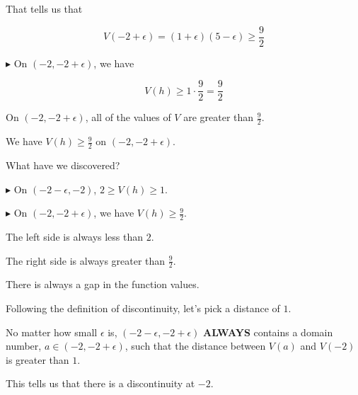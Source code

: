 \documentclass{ximera}
\begin{document}
\begin{explanation}
\begin{itemize}
That tells us that

\[ V(-2 + \epsilon) =  (1 + \epsilon) (5 - \epsilon) \geq \frac{9}{2} \]


\textbf{\textcolor{blue!55!black}{$\blacktriangleright$}} On $(-2, -2 + \epsilon)$, we have


\[
V(h) \geq 1 \cdot \frac{9}{2} = \frac{9}{2}
\]



On $(-2, -2 + \epsilon)$, all of the values of $V$ are greater than $\frac{9}{2}$.


We have $V(h) \geq  \frac{9}{2}$ on $(-2, -2 + \epsilon)$.




\end{itemize}


What have we discovered?


\textbf{\textcolor{red!70!darkgray}{$\blacktriangleright$}} On $(-2 - \epsilon, -2)$, $2 \geq V(h) \geq 1$. 

\textbf{\textcolor{red!70!darkgray}{$\blacktriangleright$}} On $(-2, -2 + \epsilon)$, we have $V(h) \geq  \frac{9}{2}$. 

The left side is always less than $2$.

The right side is always greater than $\frac{9}{2}$.


There is always a gap in the function values.


Following the definition of discontinuity, let's pick a distance of $1$.


No matter how small $\epsilon$ is, $(-2 - \epsilon, -2 + \epsilon)$ \textbf{\textcolor{red!70!darkgray}{ALWAYS}} contains a domain number, $a \in (-2, -2 + \epsilon)$, such that the distance between $V(a)$ and $V(-2)$ is greater than $1$.

This tells us that there is a discontinuity at $-2$.

\end{explanation}
\end{document}
